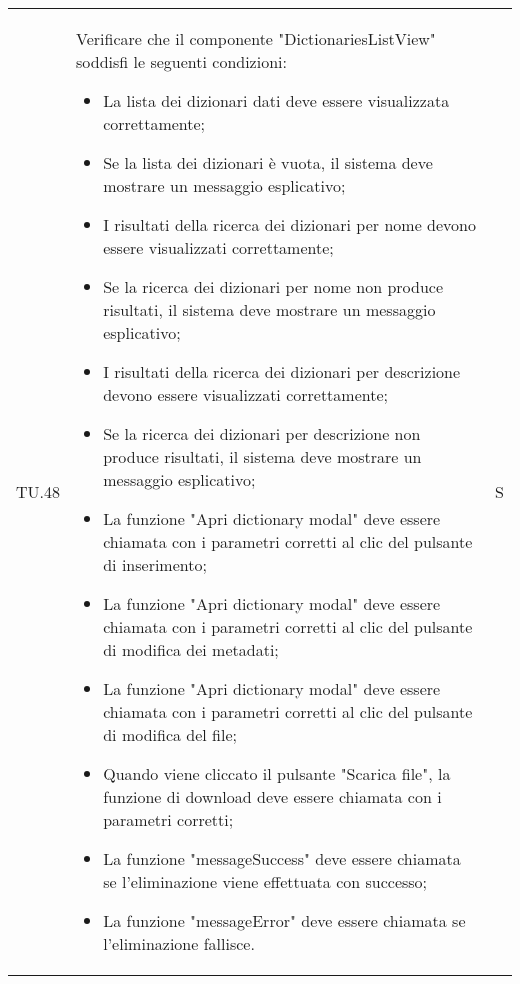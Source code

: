 \begin{adjustwidth}{-0.5cm}{-0.5cm}
\begin{longtable}{|P{1.5cm}|>{\raggedright}P{9.5cm}|>{\arraybackslash}P{1.5cm}|}
		\hline TU.48 & Verificare che il componente "DictionariesListView" soddisfi le seguenti condizioni:
    \begin{itemize}
      \item La lista dei dizionari dati deve essere visualizzata correttamente;
			\item Se la lista dei dizionari è vuota, il sistema deve mostrare un messaggio esplicativo;
			\item I risultati della ricerca dei dizionari per nome devono essere visualizzati correttamente;
			\item Se la ricerca dei dizionari per nome non produce risultati, il sistema deve mostrare un messaggio esplicativo;
			\item I risultati della ricerca dei dizionari per descrizione devono essere visualizzati correttamente;
			\item Se la ricerca dei dizionari per descrizione non produce risultati, il sistema deve mostrare un messaggio esplicativo;
			\item La funzione "Apri dictionary modal" deve essere chiamata con i parametri corretti al clic del pulsante di inserimento;
			\item La funzione "Apri dictionary modal" deve essere chiamata con i parametri corretti al clic del pulsante di modifica dei metadati;
			\item La funzione "Apri dictionary modal" deve essere chiamata con i parametri corretti al clic del pulsante di modifica del file;
			\item Quando viene cliccato il pulsante "Scarica file", la funzione di download deve essere chiamata con i parametri corretti;
			\item La funzione "messageSuccess" deve essere chiamata se l'eliminazione viene effettuata con successo;
			\item La funzione "messageError" deve essere chiamata se l'eliminazione fallisce.
    \end{itemize} & S \\


\end{longtable}
\end{adjustwidth}
